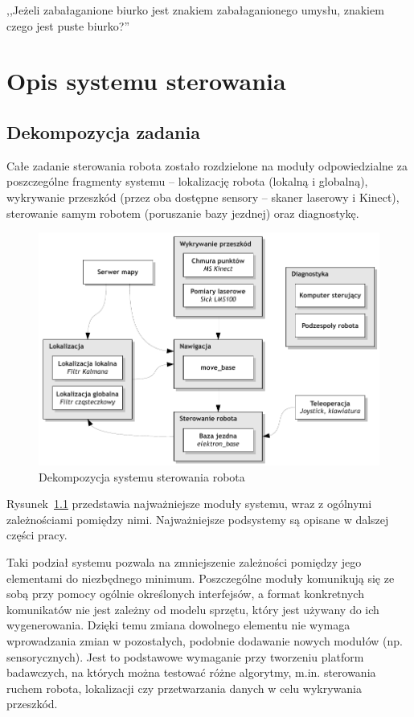

\begin{savequote}[70mm]
,,Jeżeli zabałaganione biurko jest znakiem zabałaganionego umysłu, znakiem czego
jest puste biurko?''
\end{savequote}


\chapter{Opis systemu sterowania}
\label{chap:software}

\section{Dekompozycja zadania}

Całe zadanie sterowania robota zostało rozdzielone na moduły odpowiedzialne
za poszczególne fragmenty systemu -- lokalizację robota (lokalną i globalną), 
wykrywanie przeszkód (przez oba dostępne sensory -- skaner laserowy i Kinect),
sterowanie samym robotem (poruszanie bazy jezdnej) oraz diagnostykę.

\begin{figure}[ht!]
\centering
\includegraphics{../img/decomposition}
\caption{Dekompozycja systemu sterowania robota}
\label{fig:decomposition}
\end{figure}

Rysunek~\ref{fig:decomposition} przedstawia najważniejsze moduły systemu,
wraz z ogólnymi zależnościami pomiędzy nimi. Najważniejsze podsystemy
są opisane w dalszej części pracy. 

Taki podział systemu pozwala na zmniejszenie zależności pomiędzy jego elementami
do niezbędnego minimum. Poszczególne moduły komunikują się ze sobą przy pomocy 
ogólnie określonych interfejsów, a format konkretnych komunikatów nie jest 
zależny od modelu sprzętu, który jest używany do ich wygenerowania. Dzięki temu
zmiana dowolnego elementu nie wymaga wprowadzania zmian w pozostałych,
podobnie dodawanie nowych modułów (np. sensorycznych). Jest to podstawowe
wymaganie przy tworzeniu platform badawczych, na których można testować różne
algorytmy, m.in. sterowania ruchem robota, lokalizacji czy przetwarzania danych
w celu wykrywania przeszkód. 


